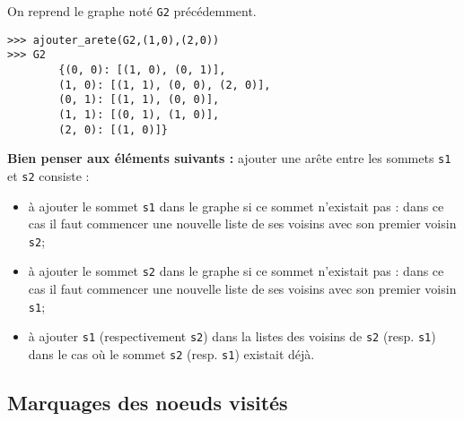 \begin{exemple}
On reprend le graphe noté \lstinline{G2} précédemment. 
\begin{lstlisting}
>>> ajouter_arete(G2,(1,0),(2,0))
>>> G2
        {(0, 0): [(1, 0), (0, 1)],
        (1, 0): [(1, 1), (0, 0), (2, 0)],
        (0, 1): [(1, 1), (0, 0)],
        (1, 1): [(0, 1), (1, 0)],
        (2, 0): [(1, 0)]}
\end{lstlisting}
\end{exemple}


\textbf{Bien penser aux éléments suivants :} ajouter une arête entre les sommets \lstinline{s1} et \lstinline{s2} consiste :
\begin{itemize}
\item à ajouter le sommet \lstinline{s1} dans le graphe si ce sommet n'existait pas : dans ce cas il faut commencer une nouvelle liste de ses voisins avec son premier voisin \lstinline{s2};
\item à ajouter le sommet \lstinline{s2} dans le graphe si ce sommet n'existait pas : dans ce cas il faut commencer une nouvelle liste de ses voisins avec son premier voisin \lstinline{s1};
\item à ajouter \lstinline{s1} (respectivement \lstinline{s2}) dans la listes des voisins de \lstinline{s2} (resp. \lstinline{s1}) dans le cas où le sommet \lstinline{s2} (resp. \lstinline{s1}) existait déjà.
\end{itemize}


\subsection*{Marquages des noeuds visités}

